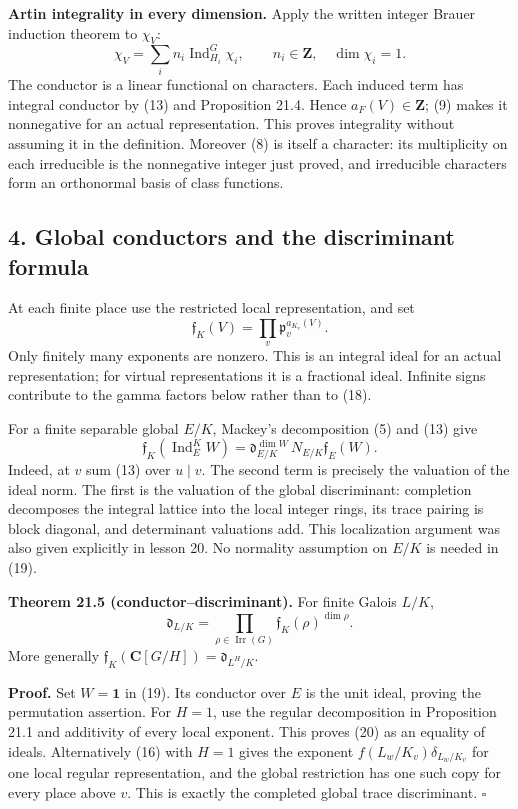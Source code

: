 \documentclass[11pt,a4paper]{article}
\begin{document}
\textbf{Artin integrality in every dimension.} Apply the written integer
Brauer induction theorem to \(\chi_V\): \[
\chi_V=\sum_i n_i\operatorname{Ind}_{H_i}^G\chi_i,
\qquad n_i\in\mathbf Z,\quad\dim\chi_i=1.
\tag{17}
\] The conductor is a linear functional on characters. Each induced term
has integral conductor by (13) and Proposition 21.4. Hence
\(a_F(V)\in\mathbf Z\); (9) makes it nonnegative for an actual
representation. This proves integrality without assuming it in the
definition. Moreover (8) is itself a character: its multiplicity on each
irreducible is the nonnegative integer just proved, and irreducible
characters form an orthonormal basis of class functions.

\subsection{4. Global conductors and the discriminant
formula}\label{global-conductors-and-the-discriminant-formula}

At each finite place use the restricted local representation, and set \[
\mathfrak f_K(V)=\prod_v\mathfrak p_v^{a_{K_v}(V)}.
\tag{18}
\] Only finitely many exponents are nonzero. This is an integral ideal
for an actual representation; for virtual representations it is a
fractional ideal. Infinite signs contribute to the gamma factors below
rather than to (18).

For a finite separable global \(E/K\), Mackey's decomposition (5) and
(13) give \[
\mathfrak f_K(\operatorname{Ind}_{E}^{K}W)
=\mathfrak d_{E/K}^{\dim W}\,N_{E/K}\mathfrak f_E(W).
\tag{19}
\] Indeed, at \(v\) sum (13) over \(u\mid v\). The second term is
precisely the valuation of the ideal norm. The first is the valuation of
the global discriminant: completion decomposes the integral lattice into
the local integer rings, its trace pairing is block diagonal, and
determinant valuations add. This localization argument was also given
explicitly in lesson 20. No normality assumption on \(E/K\) is needed in
(19).

\textbf{Theorem 21.5 (conductor--discriminant).} For finite Galois
\(L/K\), \[
\mathfrak d_{L/K}
=\prod_{\rho\in\operatorname{Irr}(G)}\mathfrak f_K(\rho)^{\dim\rho}.
\tag{20}
\] More generally \(\mathfrak f_K(\mathbf C[G/H])=\mathfrak d_{L^H/K}\).

\textbf{Proof.} Set \(W=\mathbf1\) in (19). Its conductor over \(E\) is
the unit ideal, proving the permutation assertion. For \(H=1\), use the
regular decomposition in Proposition 21.1 and additivity of every local
exponent. This proves (20) as an equality of ideals. Alternatively (16)
with \(H=1\) gives the exponent \(f(L_w/K_v)\delta_{L_w/K_v}\) for one
local regular representation, and the global restriction has one such
copy for every place above \(v\). This is exactly the completed global
trace discriminant. \(\square\)
\end{document}
